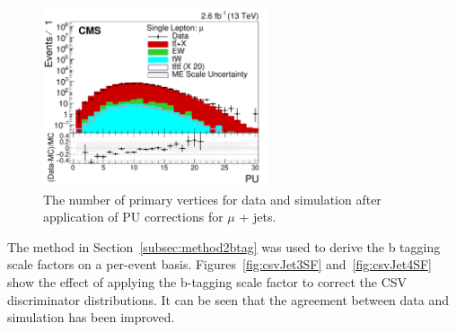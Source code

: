 \begin{figure}[h!]
\begin{center}
\includegraphics[width=0.59\textwidth]{images/Run2/PU_StackLogY.pdf}
\end{center}
\caption{The number of primary vertices for data and simulation after application of PU corrections for $\mu$ + jets.}
\label{fig:PUReWeight13}
\end{figure}

The method in Section~\ref{subsec:method2btag} was used to derive the b tagging scale factors on a per-event basis. Figures~\ref{fig:csvJet3SF} and~\ref{fig:csvJet4SF} show the effect of applying the b-tagging scale factor to correct the CSV discriminator distributions. It can be seen that the agreement between data and simulation has been improved.

